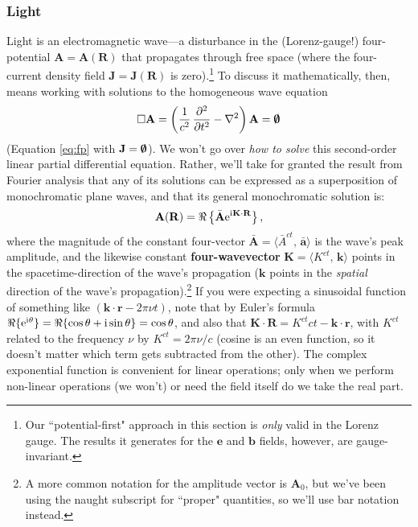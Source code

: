 \documentclass[12pt]{article}
\renewcommand{\vv}[1]{\mathbf{#1}}
\begin{document}
\subsubsection{Light}\label{sssec:li}

Light is an electromagnetic wave---a disturbance in the (Lorenz-gauge!) four-potential $\vv A = \vv A (\vv R)$ that propagates through free space (where the four-current density field $\vv J = \vv J (\vv R)$ is zero).\footnote{Our ``potential-first" approach in this section is \emph{only} valid in the Lorenz gauge. The results it generates for the $\vv e$ and $\vv b$ fields, however, are gauge-invariant.} To discuss it mathematically, then, means working with solutions to the homogeneous wave equation
\begin{equation*}
\Box \vv A =  \left( \dfrac{1}{c^2} \, \dfrac{\partial^2}{\partial t^2} - \nabla ^2 \right) \vv A = \textrm{\mbox{\boldmath $\emptyset$}}
\end{equation*}
(Equation \ref{eq:fp} with $\vv J = \textrm{\mbox{\boldmath$\emptyset$}}$). We won't go over \emph{how to solve} this second-order linear partial differential equation. Rather, we'll take for granted the result from Fourier analysis that any of its solutions can be expressed as a superposition of monochromatic plane waves, and that its general monochromatic solution is:
\begin{equation}\label{eq:pw}
\vv A (\vv R) = \Re \left \lbrace \bar{\vv A} \mathrm{e}^{\mathrm{i} \mkern.5mu \vv K \cdot \vv R} \right \rbrace ,
\end{equation}
where the magnitude of the constant four-vector $\bar{\vv A} = \langle \bar{A}^{ct}, \, \bar{\vv a} \rangle$ is the wave's peak amplitude, and the likewise constant \textbf{four-wavevector} ${\vv K = \langle K^{ct}, \, \vv k \rangle}$ points in the spacetime-direction of the wave's propagation ($\vv k$ points in the \emph{spatial} direction of the wave's propagation).\footnote{A more common notation for the amplitude vector is $\vv A_0$, but we've been using the naught subscript for ``proper" quantities, so we'll use bar notation instead.} If you were expecting a sinusoidal function of something like $(\vv k \cdot \vv r - 2 \pi \nu t )$, note that by Euler's formula ${\Re \lbrace \mathrm{e}^{\mathrm{i} \mkern.5mu \theta} \rbrace = \Re \lbrace \cos \theta + \mathrm{i} \sin \theta \rbrace = \cos \theta}$, and also that $\vv K \cdot \vv R = K^{ct}ct - \vv k \cdot \vv r$, with $K^{ct}$ related to the frequency $\nu$ by $K^{ct} = 2 \pi \nu / c$ (cosine is an even function, so it doesn't matter which term gets subtracted from the other). The complex exponential function is convenient for linear operations; only when we perform non-linear operations (we won't) or need the field itself do we take the real part.
\end{document}

